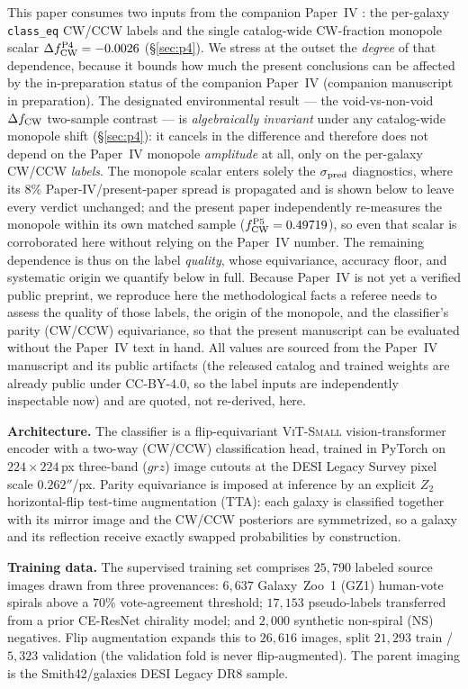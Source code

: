 \documentclass[aps,prd,twocolumn,superscriptaddress,showpacs,preprintnumbers,nofootinbib,longbibliography,floatfix]{revtex4-2}
\newcommand{\paperIVarxiv}{companion manuscript in preparation}
\begin{document}
This paper consumes two inputs from the companion Paper~IV
\cite{golden_chirality_2026}: the per-galaxy \texttt{class\_eq} CW/CCW
labels and the single catalog-wide CW-fraction monopole scalar
$\Delta f_{\rm CW}^{\rm P4}=-0.0026$ (\S\ref{sec:p4}). We stress at the
outset the \emph{degree} of that dependence, because it bounds how much
the present conclusions can be affected by the in-preparation status of
the companion Paper~IV (\paperIVarxiv). The designated environmental result --- the void-vs-non-void
$\Delta f_{\rm CW}$ two-sample contrast --- is \emph{algebraically
invariant} under any catalog-wide monopole shift (\S\ref{sec:p4}): it
cancels in the difference and therefore does not depend on the Paper~IV
monopole \emph{amplitude} at all, only on the per-galaxy CW/CCW
\emph{labels}. The monopole scalar enters solely the $\sigma_{\rm pred}$
diagnostics, where its $8\%$ Paper-IV/present-paper spread is propagated
and is shown below to leave every verdict unchanged; and the present
paper independently re-measures the monopole within its own matched
sample ($f_{\rm CW}^{\rm P5}=0.49719$), so even that scalar is
corroborated here without relying on the Paper~IV number. The remaining
dependence is thus on the label \emph{quality}, whose equivariance,
accuracy floor, and systematic origin we quantify below in full.
Because Paper~IV is not yet a verified public preprint, we reproduce here the
methodological facts a referee needs to assess the quality of those
labels, the origin of the monopole, and the classifier's parity
(CW/CCW) equivariance, so that the present manuscript can be evaluated
without the Paper~IV text in hand. All values are sourced from the
Paper~IV manuscript and its public artifacts (the released catalog and
trained weights are already public under CC-BY-4.0, so the label inputs
are independently inspectable now) and are quoted, not
re-derived, here.

\textbf{Architecture.} The classifier is a flip-equivariant
\textsc{ViT-Small} vision-transformer encoder with a two-way
(CW/CCW) classification head, trained in PyTorch on
$224\times224$\,px three-band ($grz$) image cutouts at the
DESI Legacy Survey pixel scale $0.262''$/px. Parity equivariance is
imposed at inference by an explicit $Z_2$ horizontal-flip
test-time augmentation (TTA): each galaxy is classified together with
its mirror image and the CW/CCW posteriors are symmetrized, so a galaxy
and its reflection receive exactly swapped probabilities by
construction.

\textbf{Training data.} The supervised training set comprises
$25{,}790$ labeled source images drawn from three provenances:
$6{,}637$ Galaxy~Zoo~1 (GZ1) human-vote spirals above a $70\%$
vote-agreement threshold; $17{,}153$ pseudo-labels transferred from a
prior CE-ResNet chirality model; and $2{,}000$ synthetic
non-spiral (NS) negatives. Flip augmentation expands this to
$26{,}616$ images, split $21{,}293$ train / $5{,}323$ validation
(the validation fold is never flip-augmented). The parent imaging is
the Smith42/galaxies DESI Legacy DR8 sample.
\end{document}
